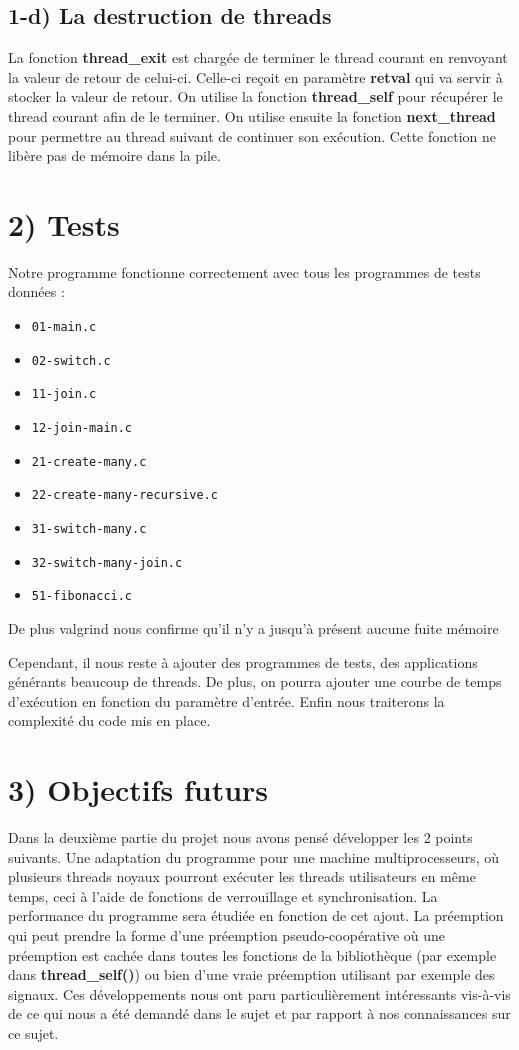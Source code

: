 \documentclass{report}
\begin{document}
\subsection*{1-d) La destruction de threads}
La fonction \textbf{thread\_exit} est chargée de terminer le thread courant en
renvoyant la valeur de retour de celui-ci.
Celle-ci reçoit en paramètre \textbf{retval} qui va servir à stocker la valeur
de retour. On utilise la fonction \textbf{thread\_self} pour récupérer le
thread courant afin de le terminer.
On utilise ensuite la fonction \textbf{next\_thread} pour permettre au thread
suivant de continuer son exécution.
Cette fonction ne libère pas de mémoire dans la pile.

\section*{2) Tests}

Notre programme fonctionne correctement avec tous les programmes de tests
données : 
\begin{itemize}
\item \verb!01-main.c!
\item \verb!02-switch.c!	
\item \verb!11-join.c!	
\item \verb!12-join-main.c!	
\item \verb!21-create-many.c!	
\item \verb!22-create-many-recursive.c!	
\item \verb!31-switch-many.c!	
\item \verb!32-switch-many-join.c!	
\item \verb!51-fibonacci.c!	
\end{itemize}
De plus valgrind nous confirme qu'il n'y a jusqu'à présent aucune fuite mémoire

Cependant, il nous reste à ajouter des programmes de tests, des applications
générants beaucoup de threads. De plus, on pourra ajouter une courbe de temps
d'exécution en fonction du paramètre d'entrée.
Enfin nous traiterons la complexité du code mis en place.


\section*{3) Objectifs futurs}
Dans la deuxième partie du projet nous avons pensé développer les 2 points
suivants.
Une adaptation du programme pour une machine multiprocesseurs, où plusieurs
threads noyaux pourront exécuter les threads utilisateurs en même temps, ceci à
l’aide de fonctions de verrouillage et synchronisation.
La performance du programme sera étudiée en fonction de cet ajout.
La préemption qui peut prendre la forme d’une préemption pseudo-coopérative où
une préemption est cachée dans toutes les fonctions de la bibliothèque (par
exemple dans \textbf{thread\_self()}) ou bien d’une vraie préemption utilisant
par exemple des signaux.
Ces développements nous ont paru particulièrement intéressants vis-à-vis de ce
qui nous a été demandé dans le sujet et par rapport à nos connaissances sur ce
sujet.
\end{document}
